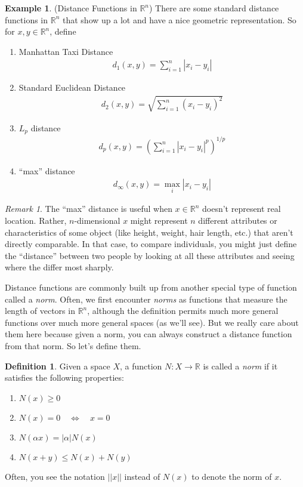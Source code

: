 \documentclass[12pt]{article}
\numberwithin{equation}{section} %
\theoremstyle{plain}
\theoremstyle{definition}
\newtheorem{defn}[thm]{Definition}
\newtheorem{ex}[thm]{Example}
\theoremstyle{remark}
\newtheorem*{rmk}{Remark}
\newcommand{\R}{\mathbb{R}}
\begin{document}
\begin{ex}{(Distance Functions in $\R^n$)}
There are some standard distance functions in $\R^n$ that show
up a lot and have a nice geometric representation. So for $x,y\in
\R^n$, define
\begin{enumerate}
  \item Manhattan Taxi Distance
    \begin{align*}
      d_1(x,y) = \sum^n_{i=1} |x_i - y_i|
    \end{align*}

  \item Standard Euclidean Distance
    \begin{align*}
      d_2(x,y) = \sqrt{\sum^n_{i=1} (x_i - y_i)^2}
    \end{align*}

  \item $L_p$ distance
    \begin{align*}
      d_p(x,y) = \left(\sum^n_{i=1} |x_i - y_i|^p\right)^{1/p}
    \end{align*}

  \item ``max'' distance
    \begin{align*}
      d_\infty(x,y) = \max_{i} |x_i-y_i|
    \end{align*}

\end{enumerate}
\end{ex}
\begin{rmk}
The ``max'' distance is useful when $x\in\R^n$ doesn't represent
real location. Rather, $n$-dimensional $x$ might represent $n$ different
attributes or characteristics of some object (like height, weight, hair
length, etc.) that aren't directly comparable. In that case, to compare
individuals, you might just define the ``distance'' between two people
by looking at all these attributes and seeing where the differ most
sharply.
\end{rmk}

Distance functions are commonly built up from another special type of
function called a \emph{norm}. Often, we first encounter \emph{norms} as
functions that measure the length of vectors in $\R^n$, although
the definition permits much more general functions over much more
general spaces (as we'll see). But we really care about them here
because given a norm, you can always construct a distance function from
that norm. So let's define them.

\begin{defn}
\label{defn:norm}
Given a space $X$, a function $N:X\rightarrow \R$ is called a
\emph{norm} if it satisfies the following properties:
\begin{enumerate}
  \item $N(x)\geq 0$
  \item $N(x)=0 \quad \Leftrightarrow \quad x=0$
  \item $N(\alpha x)= |\alpha| N(x)$
  \item $N(x+y) \leq N(x) + N(y)$
\end{enumerate}
Often, you see the notation $||x||$ instead of $N(x)$ to denote the norm
of $x$.
\end{defn}
\end{document}
